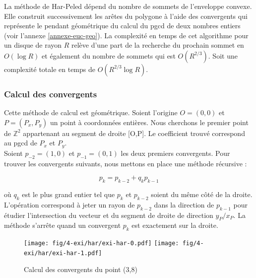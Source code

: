 La méthode de Har-Peled dépend du nombre de sommets de l'enveloppe convexe. Elle construit successivement les arêtes du polygone à l'aide des convergents qui représente le pendant géométrique du calcul du pgcd de deux nombres entiers (voir l'annexe \ref{annexe-euc-geo}). La complexité en temps de cet algorithme pour un disque de rayon $R$ relève d'une part de la recherche du prochain sommet en $O(\log R)$ et également du nombre de sommets qui est $O(R^{2/3})$. Soit une complexité totale en temps de $O( R^{2/3} \log R)$.

\subsubsection{Calcul des convergents}

Cette méthode de calcul est géométrique. Soient l’origine $O=(0,0)$ et $P = (P_x, P_y)$ un point à coordonnées entières. Nous cherchons le premier point de $\mathbb{Z}^{2}$ appartenant au segment de droite [O,P]. Le coefficient trouvé correspond au pgcd de $P_x$ et $P_y$.\\

Soient $p_{-2} = (1,0)$ et $p_{-1} = (0,1)$ les deux premiers convergents. Pour trouver les convergents suivants, nous mettons en place une méthode récursive :

$$p_{k} = p_{k-2} + q_k p_{k-1}$$

où $q_k$ est le plus grand entier tel que $p_{k}$ et $p_{k-2}$ soient du même côté de la droite.\\

L'opération correspond à jeter un rayon de $p_{k-2}$ dans la direction de $p_{k-1}$ pour étudier l’intersection du vecteur et du segment de droite de direction $y_P / x_P$. La méthode s’arrête quand un convergent $p_{k}$ est exactement sur la droite.\\

\begin{figure}[H]
  \centering
  \texttt{[image: fig/4-exi/har/exi-har-0.pdf]}
  \texttt{[image: fig/4-exi/har/exi-har-1.pdf]}
  \caption{Calcul des convergents du point (3,8)}
\end{figure}


